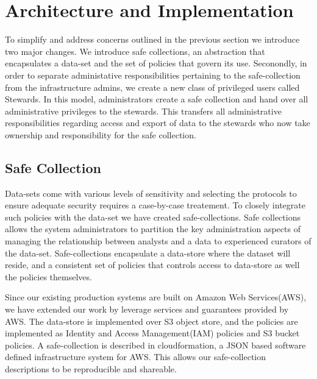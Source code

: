 \section{Architecture and Implementation}
\label{sec:architecture}


To simplify and address concerns outlined in the previous section we introduce two
major changes. We introduce safe collections, an abstraction that encapsulates
a data-set and the set of policies that govern its use. Seconondly, in order to separate
administative responsibilities pertaining to the safe-collection from the infrastructure
admins, we create a new class of privileged users called Stewards. In this model, administrators
create a safe collection and hand over all administrative privileges to the stewards. This transfers
all administrative responsibilities regarding access and export of data to the stewards who now take
ownership and responsibility for the safe collection.

\subsection{Safe Collection}

Data-sets come with various levels of sensitivity and selecting the protocols to ensure adequate security
requires a case-by-case treatement. To closely integrate such policies with the data-set we have created
safe-collections. Safe collections allows the system administrators to partition the key administration
aspects of managing the relationship between analysts and a data to experienced curators of the data-set.
Safe-collections encapsulate a data-store where the dataset will reside, and a consistent set of policies
that controls access to data-store as well the policies themselves.

Since our existing production systems are built on Amazon Web Services(AWS), we have extended our work by
leverage services and guarantees provided by AWS. The data-store is implemented over S3 object store, and the
policies are implemented as Identity and Access Management(IAM) policies and S3 bucket policies.
A safe-collection is described in cloudformation, a JSON based software defined infrastructure system for AWS.
This allows our safe-collection descriptions to be reproducible and shareable.

